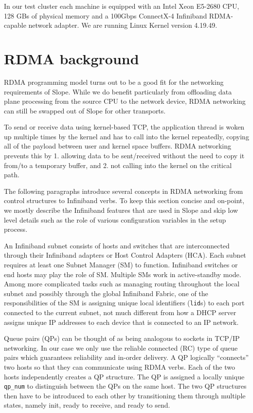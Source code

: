 In our test cluster each machine is equipped with an Intel Xeon E5-2680 CPU,
128 GBs of physical memory and a 100Gbps ConnectX-4 Infiniband RDMA-capable
network adapter. We are running Linux Kernel version 4.19.49.

\section{RDMA background}
RDMA programming model turns out to be a good fit for the networking
requirements of Slope. While we do benefit particularly from
offloading data plane processing from the source CPU to the network device,
RDMA networking can still be swapped out of Slope for other transports.

To send or receive data using kernel-based TCP, the application thread
is woken up multiple times by the kernel and has to call into the kernel
repeatedly, copying all of the payload between user and kernel space buffers.
RDMA networking prevents this by 1. allowing data to be sent/received without
the need to copy it from/to a temporary buffer, and 2. not calling into the
kernel on the critical path.

The following paragraphs introduce several concepts in RDMA
networking from control structures to Infiniband verbs. To keep this section
concise and on-point, we mostly describe the Infiniband features that are used
in Slope and skip low level details such as the role of various configuration
variables in the setup process.

An Infiniband subnet consists of hosts and switches that are interconnected
through their Infiniband adapters or Host Control Adapters (HCA).
Each subnet requires at least one Subnet Manager (SM) to function.
Infiniband switches or end hosts may play the role of SM. Multiple SMs
work in active-standby mode. Among more complicated tasks such as managing
routing throughout the local subnet and possibly through the global Infiniband
Fabric, one of the responsibilities of the SM is assigning unique local
identifiers (\texttt{lid}s) to each port connected to the current subnet, not much
different from how a DHCP server assigns unique IP addresses to each device
that is connected to an IP network.

Queue pairs (QPs) can be thought of as being analogous to sockets in TCP/IP
networking. In our case we only use the reliable connected (RC) type of queue
pairs which guarantees reliability and in-order delivery.
A QP logically ``connects'' two hosts so that they can communicate using
RDMA verbs. Each of the two hosts independently creates a QP structure. The
QP is assigned a locally unique \texttt{qp\_num} to distinguish between the
QPs on the same host. The two QP structures then have to be introduced to
each other by transitioning them through multiple states, namely init, ready to
receive, and ready to send.

